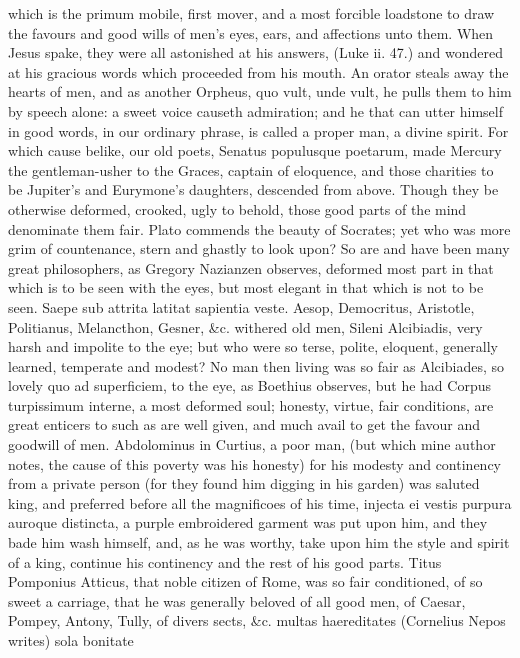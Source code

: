 {which is the primum mobile, first mover, and a most forcible loadstone
to draw the favours and good wills of men's eyes, ears, and affections
unto them. When Jesus spake, they were all astonished at his answers,
(Luke ii. 47.) and wondered at his gracious words which proceeded from
his mouth. An orator steals away the hearts of men, and as another
Orpheus, quo vult, unde vult, he pulls them to him by speech alone: a
sweet voice causeth admiration; and he that can utter himself in good
words, in our ordinary phrase, is called a proper man, a divine spirit.
For which cause belike, our old poets, Senatus populusque poetarum,
made Mercury the gentleman-usher to the Graces, captain of eloquence,
and those charities to be Jupiter's and Eurymone's daughters, descended
from above. Though they be otherwise deformed, crooked, ugly to behold,
those good parts of the mind denominate them fair. Plato commends the
beauty of Socrates; yet who was more grim of countenance, stern and
ghastly to look upon? So are and have been many great philosophers, as
Gregory Nazianzen observes, deformed most part in that which is
to be seen with the eyes, but most elegant in that which is not to be
seen. Saepe sub attrita latitat sapientia veste. Aesop, Democritus,
Aristotle, Politianus, Melancthon, Gesner, \&c. withered old men, Sileni
Alcibiadis, very harsh and impolite to the eye; but who were so terse,
polite, eloquent, generally learned, temperate and modest? No man then
living was so fair as Alcibiades, so lovely quo ad superficiem, to the
eye, as Boethius observes, but he had Corpus turpissimum interne,
a most deformed soul; honesty, virtue, fair conditions, are great
enticers to such as are well given, and much avail to get the favour
and goodwill of men. Abdolominus in Curtius, a poor man, (but which
mine author notes, the cause of this poverty was his honesty) for
his modesty and continency from a private person (for they found him
digging in his garden) was saluted king, and preferred before all the
magnificoes of his time, injecta ei vestis purpura auroque distincta, a
purple embroidered garment was put upon him, and they bade him
wash himself, and, as he was worthy, take upon him the style and spirit
of a king, continue his continency and the rest of his good parts.
Titus Pomponius Atticus, that noble citizen of Rome, was so fair
conditioned, of so sweet a carriage, that he was generally beloved of
all good men, of Caesar, Pompey, Antony, Tully, of divers sects, \&c.
multas haereditates (Cornelius Nepos writes) sola bonitate
}
